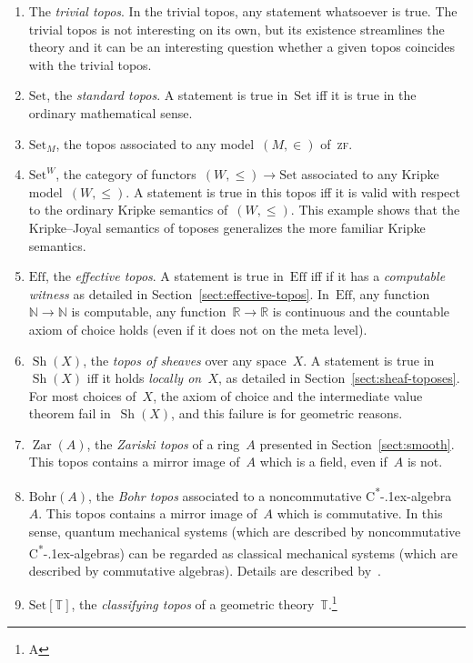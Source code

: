\documentclass[graybox]{svmult}
\newcommand{\NN}{\mathbb{N}}
\newcommand{\TT}{\mathbb{T}}
\newcommand{\RR}{\mathbb{R}}
\DeclareMathOperator{\Sh}{Sh}
\DeclareMathOperator{\Zar}{Zar}
\newcommand{\Set}{\mathrm{Set}}
\newcommand{\Eff}{\mathrm{Ef{}f}}
\renewcommand{\_}{\mathpunct{.}\,}
\newcommand{\effective}{ef{}fective\xspace}
\newcommand{\?}{\,{:}\,}
\begin{document}
\begin{enumerate}
\item The \emph{trivial topos}. In the trivial topos, any statement whatsoever
is true. The trivial topos is not interesting on its own, but its existence
streamlines the theory and it can be an interesting question whether a given
topos coincides with the trivial topos.
\item $\Set$, the \emph{standard topos}. A statement is true in~$\Set$ iff it is true
in the ordinary mathematical sense.
\item $\Set_M$, the topos associated to any model~$(M,\in)$ of~\textsc{zf}.
\item $\Set^W$, the category of functors~$(W,\leq) \to \Set$ associated to
any Kripke model~$(W,\leq)$. A statement is true in this topos iff it is valid
with respect to the ordinary Kripke semantics of~$(W,\leq)$. This example shows
that the Kripke--Joyal semantics of toposes generalizes the more familiar
Kripke semantics.
\item $\Eff$, the \emph{\effective topos}. A statement is true in~$\Eff$ iff
if it has a \emph{computable witness} as detailed in
Section~\ref{sect:effective-topos}. In~$\Eff$, any function~$\NN \to \NN$ is
computable, any function~$\RR \to \RR$ is continuous and the countable axiom of
choice holds (even if it does not on the meta level).
\item $\Sh(X)$, the \emph{topos of sheaves} over any space~$X$. A statement is true
in~$\Sh(X)$ iff it holds \emph{locally on~$X$}, as detailed in
Section~\ref{sect:sheaf-toposes}. For most choices of~$X$, the
axiom of choice and the intermediate value theorem fail in~$\Sh(X)$, and this
failure is for geometric reasons.
\item $\Zar(A)$, the \emph{Zariski topos} of a ring~$A$ presented in
Section~\ref{sect:smooth}. This topos contains a mirror
image of~$A$ which is a field, even if~$A$ is not.
\item $\mathrm{Bohr}(A)$, the \emph{Bohr topos} associated to a noncommutative
C\textsuperscript{*}\kern-.1ex-algebra~$A$. This topos contains a mirror image
of~$A$ which is commutative. In this sense, quantum mechanical systems (which are
described by noncommutative C\textsuperscript{*}\kern-.1ex-algebras) can be
regarded as classical mechanical systems (which are described by commutative
algebras). Details are described by~\cite{butterfield-hamilton-isham:bohr,heunen-landsman-spitters:aqt}.
\item\label{item:classifying-topos}$\Set[\TT]$, the \emph{classifying topos} of a geometric theory~$\TT$.\footnote{A
}
\end{enumerate}
\end{document}
